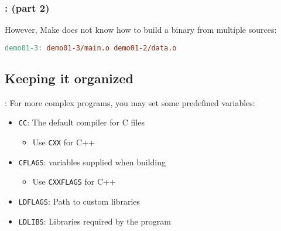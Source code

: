 \begin{frame}[fragile]
    \frametitle{\secname: \small\subsecname (part 2)\normalsize}

    However, Make does not know how to build a binary from multiple sources:

    \begin{lstlisting}[language=make]
demo01-3: demo01-3/main.o demo01-2/data.o
    \end{lstlisting}
\end{frame}

%
%
%

\subsection{Keeping it organized}
\begin{frame}{\secname: \small\subsecname\normalsize}
    For more complex programs, you may set some predefined
    variables:

    \begin{itemize}
        \item \texttt{CC}: The default compiler for C files
        \begin{itemize}
            \item Use \texttt{CXX} for C++
        \end{itemize}
        \item \texttt{CFLAGS}: variables supplied when building
        \begin{itemize}
            \item Use \texttt{CXXFLAGS} for C++
        \end{itemize}
        \item \texttt{LDFLAGS}: Path to custom libraries
        \item \texttt{LDLIBS}: Libraries required by the program
    \end{itemize}
\end{frame}
